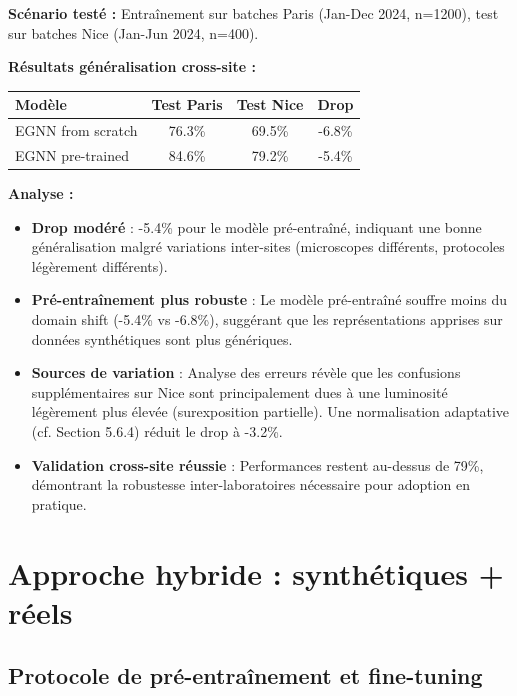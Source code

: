 \textbf{Scénario testé :} Entraînement sur batches Paris (Jan-Dec 2024, n=1200), test sur batches Nice (Jan-Jun 2024, n=400).

\textbf{Résultats généralisation cross-site :}
\begin{center}
\begin{tabular}{|l|c|c|c|}
\hline
\textbf{Modèle} & \textbf{Test Paris} & \textbf{Test Nice} & \textbf{Drop} \\
\hline
EGNN from scratch & 76.3\% & 69.5\% & -6.8\% \\
EGNN pre-trained & 84.6\% & 79.2\% & -5.4\% \\
\hline
\end{tabular}
\end{center}

\textbf{Analyse :}
\begin{itemize}
    \item \textbf{Drop modéré} : -5.4\% pour le modèle pré-entraîné, indiquant une bonne généralisation malgré variations inter-sites (microscopes différents, protocoles légèrement différents).
    
    \item \textbf{Pré-entraînement plus robuste} : Le modèle pré-entraîné souffre moins du domain shift (-5.4\% vs -6.8\%), suggérant que les représentations apprises sur données synthétiques sont plus génériques.
    
    \item \textbf{Sources de variation} : Analyse des erreurs révèle que les confusions supplémentaires sur Nice sont principalement dues à une luminosité légèrement plus élevée (surexposition partielle). Une normalisation adaptative (cf. Section 5.6.4) réduit le drop à -3.2\%.
    
    \item \textbf{Validation cross-site réussie} : Performances restent au-dessus de 79\%, démontrant la robustesse inter-laboratoires nécessaire pour adoption en pratique.
\end{itemize}

\section{Approche hybride : synthétiques + réels}

\subsection{Protocole de pré-entraînement et fine-tuning}

